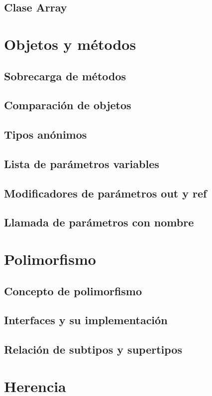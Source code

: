 \documentclass[12pt,a4paper]{report}
\begin{document}
\section{Clase Array}

\chapter{Objetos y métodos}
\section{Sobrecarga de métodos}
\section{Comparación de objetos}
\section{Tipos anónimos}
\section{Lista de parámetros variables}
\section{Modificadores de parámetros out y ref}
\section{Llamada de parámetros con nombre}

\chapter{Polimorfismo}
\section{Concepto de polimorfismo}
\section{Interfaces y su implementación}
\section{Relación de subtipos y supertipos}

\chapter{Herencia}
\end{document}

